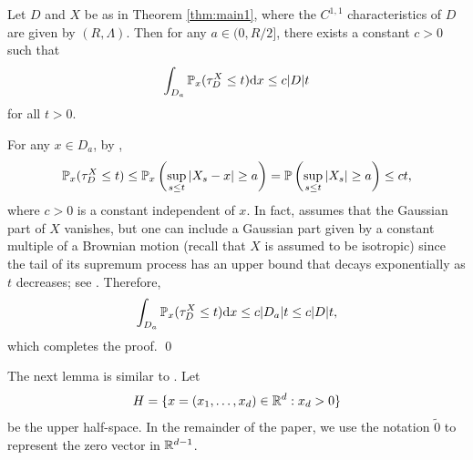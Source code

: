 \documentclass[11pt]{article}
\begin{document}
\begin{doublespace}
\begin{lemma}\label{lemma:inside}
Let $D$ and $X$ be as in Theorem \ref{thm:main1}, where the $C^{1,1}$ characteristics of $D$ are given by $(R,\Lambda)$. Then for any $a\in(0,R/2]$, there exists a constant $c>0$ such that  
\[
\int_{D_a}\P_{x}(\tau_{D}^{X}\leq t)\ud x \leq c|D|t
\]
for all $t>0$.
\end{lemma}
\pf 
For any $x\in D_a$, by \cite[Equation (3.2)]{Pruitt81}, 
\begin{align*}
\P_{x}( \tau_{D}^X \leq t) \leq \P_x\left(\sup _{s\leq t}|X_{s}-x| \geq a\right)
=\P\left(\sup _{s\leq t}|X_{s}| \geq a\right)
\le c t,
\end{align*}
where $c>0$ is a constant independent of $x$. 
In fact, \cite[Equation (3.2)]{Pruitt81} assumes that the Gaussian part of $X$ vanishes, but one can include a Gaussian part given by a constant multiple of a Brownian motion (recall that $X$ is assumed to be isotropic) since the tail of its supremum 
process has an upper bound that decays exponentially as $t$ decreases; see \cite[Chapter 2, Equation (8.3)']{KaratzasShreve}. 
Therefore,
\[
\int_{D_{a}}\P_{x}(\tau_{D}^{X}\leq t)\ud x\leq c|D_{a}|t \leq c|D|t,
\]
which completes the proof.
\qed

The next lemma is similar to \cite[Proposition 3.3]{PS22}.
Let 
\[
	H=\{x=(x_{1},\ldots, x_{d})\in \R^d : x_{d}>0\}
\]
 be the upper half-space.
 In the remainder of the paper, we use the notation $\tilde{0}$ to represent the zero vector in $\R^{d-1}$.


\end{doublespace}
\end{document}
